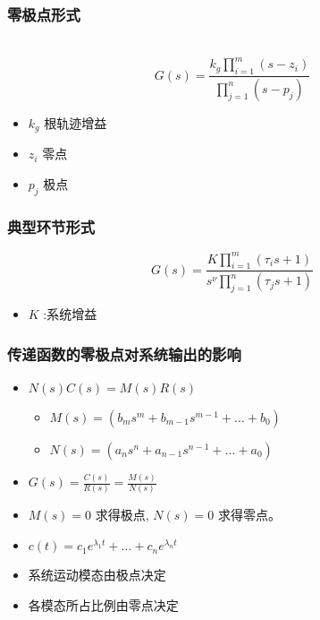 \documentclass{article}
\begin{document}
\begin{frame}
\frametitle{零极点形式}
\label{sec-2-2-3}

　$$G(s)=\frac{k_g\prod_{i=1}^m(s-z_i)}{\prod_{j=1}^n(s-p_j)}$$
\begin{itemize}
\item $k_g$ 根轨迹增益
\item $z_i$ 零点
\item $p_j$ 极点
\end{itemize}
\end{frame}
\begin{frame}
\frametitle{典型环节形式}
\label{sec-2-2-4}

   $$G(s)=\frac{K\prod_{i=1}^m(\tau_i s+1)}{s^{\nu}\prod_{j=1}^n(\tau_j s+1)}$$

\begin{itemize}
\item $K$ :系统增益
\end{itemize}
\end{frame}
\begin{frame}
\frametitle{传递函数的零极点对系统输出的影响}
\label{sec-2-2-5}

\begin{itemize}
\item <2-> $N(s)C(s)=M(s)R(s)$
\begin{itemize}
\item $M(s)=(b_m s^m+b_{m-1}s^{m-1}+...+b_0)$
\item $N(s)=(a_n s^n+a_{n-1}s^{n-1}+...+a_0)$
\end{itemize}
\item <3-> $G(s)=\frac{C(s)}{R(s)}=\frac{M(s)}{N(s)}$
\item <4-> $M(s)=0$ 求得极点, $N(s)=0$ 求得零点。
\item <5-> $c(t)=c_1e^{\lambda_1 t}+...+c_ne^{\lambda_n t}$
\item <6-> 系统运动模态由极点决定
\item <7-> 各模态所占比例由零点决定
\end{itemize}
\end{frame}
\end{document}

